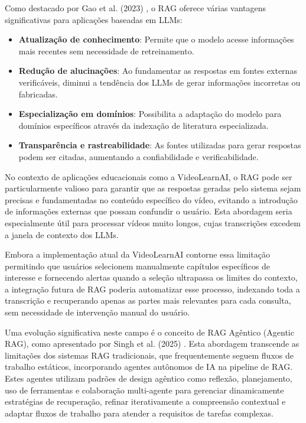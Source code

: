 \documentclass[tcc,capa]{texufpel}
\begin{document}
Como destacado por Gao et al. (2023) \cite{gao2023retrieval}, o RAG oferece várias vantagens significativas para aplicações baseadas em LLMs:

\begin{itemize}
    \item \textbf{Atualização de conhecimento}: Permite que o modelo acesse informações mais recentes sem necessidade de retreinamento.
    
    \item \textbf{Redução de alucinações}: Ao fundamentar as respostas em fontes externas verificáveis, diminui a tendência dos LLMs de gerar informações incorretas ou fabricadas.
    
    \item \textbf{Especialização em domínios}: Possibilita a adaptação do modelo para domínios específicos através da indexação de literatura especializada.
    
    \item \textbf{Transparência e rastreabilidade}: As fontes utilizadas para gerar respostas podem ser citadas, aumentando a confiabilidade e verificabilidade.
\end{itemize}

No contexto de aplicações educacionais como a VideoLearnAI, o RAG pode ser particularmente valioso para garantir que as respostas geradas pelo sistema sejam precisas e fundamentadas no conteúdo específico do vídeo, evitando a introdução de informações externas que possam confundir o usuário. Esta abordagem seria especialmente útil para processar vídeos muito longos, cujas transcrições excedem a janela de contexto dos LLMs. 

Embora a implementação atual da VideoLearnAI contorne essa limitação permitindo que usuários selecionem manualmente capítulos específicos de interesse e fornecendo alertas quando a seleção ultrapassa os limites do contexto, a integração futura de RAG poderia automatizar esse processo, indexando toda a transcrição e recuperando apenas as partes mais relevantes para cada consulta, sem necessidade de intervenção manual do usuário.

Uma evolução significativa neste campo é o conceito de RAG Agêntico (Agentic RAG), como apresentado por Singh et al. (2025) \cite{singh2025agentic}. Esta abordagem transcende as limitações dos sistemas RAG tradicionais, que frequentemente seguem fluxos de trabalho estáticos, incorporando agentes autônomos de IA na pipeline de RAG. Estes agentes utilizam padrões de design agêntico como reflexão, planejamento, uso de ferramentas e colaboração multi-agente para gerenciar dinamicamente estratégias de recuperação, refinar iterativamente a compreensão contextual e adaptar fluxos de trabalho para atender a requisitos de tarefas complexas.
\end{document}
